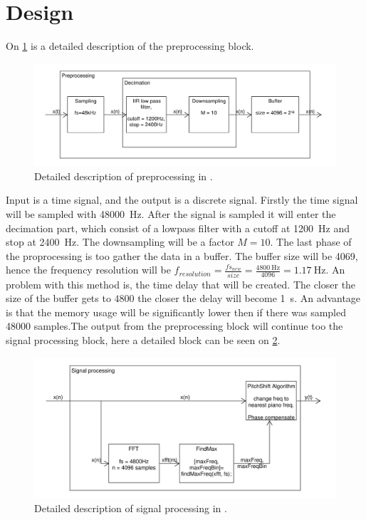 
\section{Design}
\label{ch:Design}
On \cref{fig:DetailedDesign_prepro} is a detailed description of the preprocessing block.
\begin{figure}
	\centering
	\includegraphics[width=1\linewidth]{gfx/Design/DesignDetailed_Preprocesing.pdf}
	\caption{Detailed description of preprocessing in \systemName.}
	\label{fig:DetailedDesign_prepro}
\end{figure}

Input is a time signal, and the output is a discrete signal. Firstly the time signal will be sampled with \SI{48000}{\hertz}. After the signal is sampled it will enter the decimation part, which consist of a lowpass filter with a cutoff at \SI{1200}{\hertz} and stop at \SI{2400}{\hertz}. The downsampling will be a factor $M=10$. The last phase of the proprocessing is too gather the data in a buffer. The buffer size will be 4069, hence the frequency resolution will be $f_{resolution} = \frac{fs_{new}}{size}= \frac{\SI{4800}{\hertz}}{4096}= \SI{1.17}{\hertz}$. An problem with this method is, the time delay that will be created. The closer the size of the buffer gets to $4800$ the closer the delay will become \SI{1}{\second}. An advantage is that the memory usage will be significantly lower then if there was sampled 48000 samples.\newline The output from the preprocessing block will continue too the signal processing block, here a detailed block can be seen on \cref{fig:DetailedDesign_sigpro}.
\begin{figure}
	\centering
	\includegraphics[width=1\linewidth]{gfx/Design/DesignDetailed_Signalprocessing.pdf}
	\caption{Detailed description of signal processing in \systemName.}
	\label{fig:DetailedDesign_sigpro}
\end{figure}

